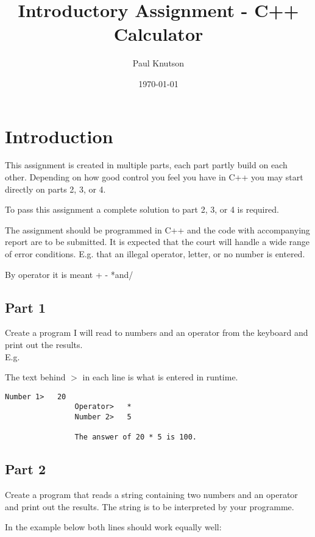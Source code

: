 \documentclass{article}
\begin{document}
	\title{Introductory Assignment - C++ Calculator}
	\date{\today}
	\author{Paul Knutson}
	\maketitle
	\thispagestyle{empty}
	\clearpage

	\tableofcontents{}
	\clearpage
	
	
	\section{Introduction}
		This assignment is created in multiple parts, each part partly build on each other. Depending on how good control you feel you have in C++ you may start directly on parts 2, 3, or 4.
		
		To pass this assignment a complete solution to part 2, 3, or 4 is required.
		
		The assignment should be programmed in C++ and the code with accompanying report are to be submitted. It is expected that the court will handle a wide range of error conditions. E.g. that an illegal operator, letter, or no number is entered.
		
		By operator it is meant + - *and/
		
		\subsection{Part 1}
			Create a program I will read to numbers and an operator from the keyboard and print out the results. \\
			
			E.g.
			
			The text behind $>$ in each line is what is entered in runtime.
			\begin{lstlisting}[numbers=none]
				Number 1>	20
				Operator>	*
				Number 2>	5
				
				The answer of 20 * 5 is 100.
			\end{lstlisting}

		\subsection{Part 2}
			Create a program that reads a string containing two numbers and an operator and print out the results. The string is to be interpreted by your programme. 
			
			In the example below both lines should work equally well:
			
\end{document}
